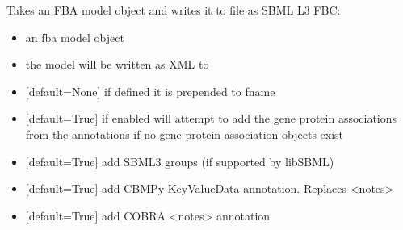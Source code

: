 \documentclass[letterpaper,10pt,english]{sphinxmanual}
\begin{document}
\begin{fulllineitems}
\label{\detokenize{modules_doc:cbmpy.CBWrite.writeSBML3FBC}}
\pysigstartsignatures
{}
\pysigstopsignatures
\sphinxAtStartPar
Takes an FBA model object and writes it to file as SBML L3 FBC:
\begin{itemize}
\item {} 
\sphinxAtStartPar
{} an fba model object

\item {} 
\sphinxAtStartPar
{} the model will be written as XML to 

\item {} 
\sphinxAtStartPar
{} {[}default=None{]} if defined it is prepended to fname

\item {} 
\sphinxAtStartPar
{} {[}default=True{]} if enabled will attempt to add the gene protein associations from the annotations
if no gene protein association objects exist

\item {} 
\sphinxAtStartPar
{} {[}default=True{]} add SBML3 groups (if supported by libSBML)

\item {} 
\sphinxAtStartPar
{} {[}default=True{]} add CBMPy KeyValueData annotation. Replaces \textless{}notes\textgreater{}

\item {} 
\sphinxAtStartPar
{} {[}default=True{]} add COBRA \textless{}notes\textgreater{} annotation


\end{itemize}
\end{fulllineitems}
\end{document}
